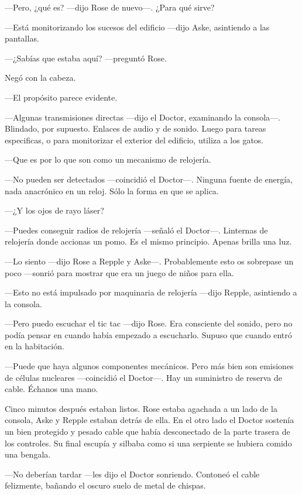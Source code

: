 {---Pero, ¿qué es? ---dijo Rose de nuevo---. ¿Para qué sirve? }

{---Está monitorizando los sucesos del edificio ---dijo Aske, asintiendo
a las pantallas.}

{---¿Sabías que estaba aquí? ---preguntó Rose. }

{Negó con la cabeza. }

{---El propósito parece evidente.}

{---Algunas transmisiones directas ---dijo el Doctor, examinando la
	consola---. Blindado, por supuesto. Enlaces de audio y de sonido. Luego
	para tareas especificas, o para monitorizar el exterior del edificio,
utiliza a los gatos.}

{---Que es por lo que son como un mecanismo de relojería.}

{---No pueden ser detectados ---coincidió el Doctor---. Ninguna fuente
	de energía, nada anacrónico en un reloj. Sólo la forma en que se
aplica.}

{---¿Y los ojos de rayo láser?}

{---Puedes conseguir radios de relojería ---señaló el Doctor---.
	Linternas de relojería donde accionas un pomo. Es el mismo principio.
Apenas brilla una luz.}

{---Lo siento ---dijo Rose a Repple y Aske---. Probablemente esto os
	sobrepase un poco ---sonrió para mostrar que era un juego de niños para
ella. }

{---Esto no está impulsado por maquinaria de relojería ---dijo Repple,
asintiendo a la consola.}

{---Pero puedo escuchar el tic tac ---dijo Rose. Era consciente del
	sonido, pero no podía pensar en cuando había empezado a escucharlo.
Supuso que cuando entró en la habitación.}

{---Puede que haya algunos componentes mecánicos. Pero más bien son
	emisiones de células nucleares ---coincidió el Doctor---. Hay un
suministro de reserva de cable. Échanos una mano.}

{Cinco minutos después estaban listos. Rose estaba agachada a un lado de
	la consola, Aske y Repple estaban detrás de ella. En el otro lado el
	Doctor sostenía un bien protegido y pesado cable que había desconectado
	de la parte trasera de los controles. Su final escupía y silbaba como si
una serpiente se hubiera comido una bengala.}

{---No deberían tardar ---les dijo el Doctor sonriendo. Contoneó el
cable felizmente, bañando el oscuro suelo de metal de chispas.}

